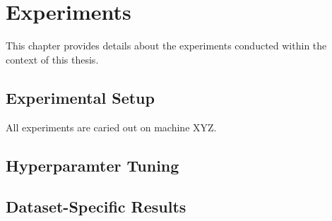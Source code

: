\chapter{Experiments\label{cha:chapter4}}
This chapter provides details about the experiments conducted within the context of this thesis. 


\section{Experimental Setup\label{sec:setup}}
All experiments are caried out on machine XYZ. 

\section{Hyperparamter Tuning\label{sec:datasets}}

\section{Dataset-Specific Results\label{sec:datasets}}








